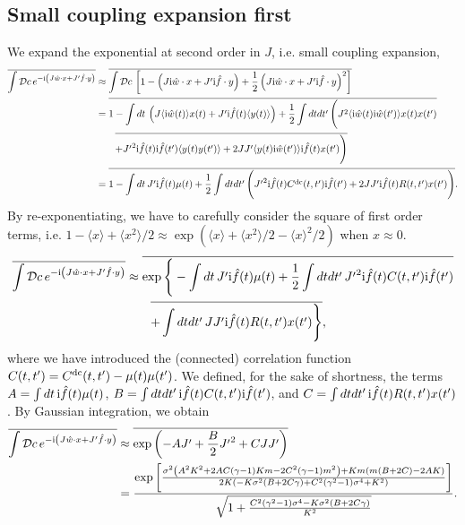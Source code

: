 \documentclass[
    preprint,
    linenumbers,
    amsmath,amssymb,amsfonts,
    aps, physrev,
    superscriptaddress,
    10pt,
    bibnotes
    ]{revtex4-2}
\begin{document}
\subsection*{Small coupling expansion first}
We expand the exponential at second order in $J$, i.e. small coupling expansion,
\begin{align}
  \overline{\int \mathcal{D}c \, e^{-{\rm i}\left(J \hat{w}\cdot x+J'\hat{f}\cdot y\right)}} & \approx\overline{\int \mathcal{D}c\,\left[1-\left(J {\rm i}\hat{w}\cdot x+J'{\rm i}\hat{f}\cdot y\right)+\frac{1}{2}\left(J {\rm i}\hat{w}\cdot x+J'{\rm i}\hat{f}\cdot y\right)^2 \right]}\\
  &=\overline{ 1 - \int dt\, \left(J \langle {\rm i}\hat{w}(t)\rangle x(t) + J' {\rm i} \hat{f}(t) \langle y(t)\rangle\right) + \frac{1}{2}\int dt dt' \, \Bigg(J^2 \langle {\rm i}\hat{w}(t){\rm i}\hat{w}(t')\rangle x(t)x(t')}\nonumber\\
  &\qquad \overline{+{J'}^2 {\rm i}\hat{f}(t){\rm i}\hat{f}(t')\langle y(t)y(t')\rangle +2JJ' \langle y(t) {\rm i}\hat{w}(t')\rangle {\rm i}\hat{f}(t)x(t')\Bigg)}\\
  &=\overline{ 1 - \int dt\, J' {\rm i} \hat{f}(t) \mu(t) + \frac{1}{2}\int dt dt' \, \Bigg({J'}^2 {\rm i}\hat{f}(t)C^{\rm dc}(t,t'){\rm i}\hat{f}(t') + 2JJ' {\rm i}\hat{f}(t) R(t,t') x(t')\Bigg)}.\label{eq:small-coupling_expanded}
\end{align}
By re-exponentiating, we have to carefully consider the square of first order terms, i.e. $1-\langle x\rangle+\langle x^2\rangle/2 \approx \exp(\langle x\rangle+\langle x^2\rangle/2 - \langle x \rangle^2/2 )$ when $x \approx 0$.
\begin{align}
  \overline{\int \mathcal{D}c \, e^{-{\rm i}\left(J \hat{w}\cdot x+J'\hat{f}\cdot y\right)}} & \approx \overline{ \exp \Bigg \{ - \int dt\, J' {\rm i} \hat{f}(t) \mu(t) + \frac{1}{2}\int dt dt' \, {J'}^2 {\rm i}\hat{f}(t)C(t,t'){\rm i}\hat{f}(t')}\nonumber\\
  &\qquad \overline{ +\int dt dt'\, JJ' {\rm i}\hat{f}(t) R(t,t') x(t')\Bigg\}},
\end{align}
where we have introduced the (connected) correlation function $C(t,t')=C^{\rm dc}(t,t')-\mu(t)\mu(t')$. We defined, for the sake of shortness, the terms $A=\int dt\, {\rm i}\hat{f}(t)\mu(t)$, $B=\int dt dt'\, {\rm i}\hat{f}(t)C(t,t'){\rm i}\hat{f}(t')$, and $C=\int dt dt'\, {\rm i}\hat{f}(t)R(t,t')x(t')$. By Gaussian integration, we obtain
\begin{align}
  \overline{\int \mathcal{D}c \, e^{-{\rm i}\left(J \hat{w}\cdot x+J'\hat{f}\cdot y\right)}} & \approx \overline{ \exp \left( -AJ'+\frac{B}{2}{J'}^2+CJJ'\right)}\\
  &=\frac{\exp \left[\frac{\sigma^2 \left(A^2 K^2+2 A C (\gamma-1) K m-2 C^2 (\gamma-1) m^2\right)+K m (m (B+2 C)-2 A K)}{2 K \left(-K \sigma^2 (B+2 C \gamma)+C^2 \left(\gamma^2-1\right) \sigma^4+K^2\right)}\right]}{\sqrt{1+\frac{C^2 \left(\gamma^2-1\right) \sigma^4-K \sigma^2 (B+2 C \gamma)}{K^2}}}.
\end{align}
\end{document}
